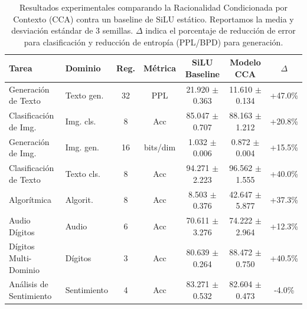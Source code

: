 \begin{table}[t]
\centering
\caption{Resultados experimentales comparando la Racionalidad Condicionada por Contexto (CCA) contra un baseline de SiLU estático. Reportamos la media y desviación estándar de 3 semillas. $\Delta$ indica el porcentaje de reducción de error para clasificación y reducción de entropía (PPL/BPD) para generación.}
\label{tab:main}
\begin{tabular}{llccccc}
\toprule
Tarea & Dominio & Reg. & Métrica & SiLU Baseline & Modelo CCA & $\Delta$ \\
\midrule
Generación de Texto & Texto gen. & 32 & PPL & 21.920 $\pm$ 0.363 & 11.610 $\pm$ 0.134 & +47.0\% \\
Clasificación de Img. & Img. cls. & 8 & Acc & 85.047 $\pm$ 0.707 & 88.163 $\pm$ 1.212 & +20.8\% \\
Generación de Img. & Img. gen. & 16 & bits/dim & 1.032 $\pm$ 0.006 & 0.872 $\pm$ 0.004 & +15.5\% \\
Clasificación de Texto & Texto cls. & 8 & Acc & 94.271 $\pm$ 2.223 & 96.562 $\pm$ 1.555 & +40.0\% \\
Algorítmica & Algorit. & 8 & Acc & 8.503 $\pm$ 0.376 & 42.647 $\pm$ 5.877 & +37.3\% \\
Audio Dígitos & Audio & 6 & Acc & 70.611 $\pm$ 3.276 & 74.222 $\pm$ 2.964 & +12.3\% \\
Dígitos Multi-Dominio & Dígitos & 3 & Acc & 80.639 $\pm$ 0.264 & 88.472 $\pm$ 0.750 & +40.5\% \\
Análisis de Sentimiento & Sentimiento & 4 & Acc & 83.271 $\pm$ 0.532 & 82.604 $\pm$ 0.473 & -4.0\% \\
\bottomrule
\end{tabular}
\end{table}